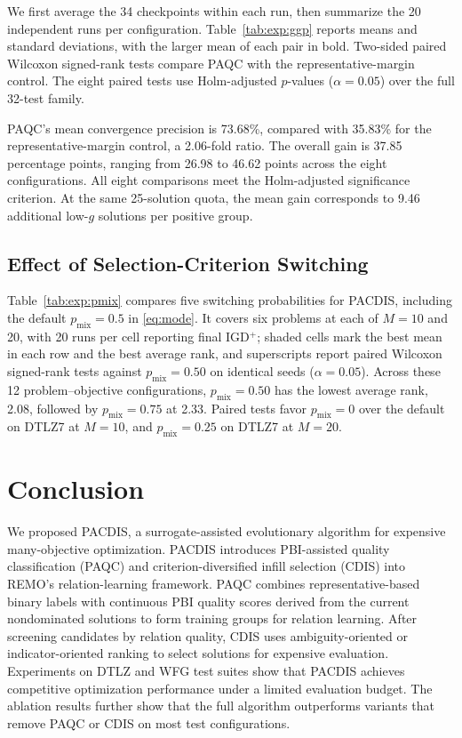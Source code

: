 \documentclass[final,5p,times,twocolumn]{elsarticle}
\begin{document}
We first average the 34 checkpoints within each run, then summarize the
20 independent runs per configuration. Table~\ref{tab:exp:ggp} reports
means and standard deviations, with the larger mean of each pair in bold. Two-sided paired Wilcoxon signed-rank tests
compare PAQC with the representative-margin control.
The eight paired tests use Holm-adjusted $p$-values ($\alpha=0.05$) over the
full 32-test family.

PAQC's mean convergence precision is 73.68\%, compared with 35.83\% for the
representative-margin control, a 2.06-fold ratio. The overall gain is 37.85
percentage points, ranging from 26.98 to 46.62 points across the eight
configurations. All eight comparisons meet the Holm-adjusted significance
criterion. At the same 25-solution quota, the mean gain corresponds to 9.46
additional low-$g$ solutions per positive group.

\subsection{Effect of Selection-Criterion Switching}
\label{sec:exp:pmix}

Table~\ref{tab:exp:pmix} compares five switching probabilities for PACDIS,
including the default $p_{\mathrm{mix}}=0.5$ in \eqref{eq:mode}.
It covers six problems at each of $M=10$ and 20, with 20 runs per cell
reporting final IGD$^+$; shaded cells mark the best mean in each row and the
best average rank, and superscripts report paired Wilcoxon signed-rank tests
against $p_{\mathrm{mix}}=0.50$ on identical seeds ($\alpha=0.05$). Across these 12 problem--objective configurations,
$p_{\mathrm{mix}}=0.50$ has the lowest average rank, 2.08, followed by
$p_{\mathrm{mix}}=0.75$ at 2.33. Paired tests favor
$p_{\mathrm{mix}}=0$ over the default on DTLZ7 at $M=10$, and
$p_{\mathrm{mix}}=0.25$ on DTLZ7 at $M=20$.

\section{Conclusion}\label{sec:conclusion}
We proposed PACDIS, a surrogate-assisted evolutionary algorithm for expensive
many-objective optimization. PACDIS introduces PBI-assisted quality classification
(PAQC) and criterion-diversified infill selection (CDIS) into REMO's relation-learning
framework. PAQC combines representative-based binary labels with continuous PBI
quality scores derived from the current nondominated solutions to form training
groups for relation learning. After screening candidates by relation quality,
CDIS uses ambiguity-oriented or indicator-oriented ranking to select solutions
for expensive evaluation. Experiments on DTLZ and WFG test suites show that
PACDIS achieves competitive optimization performance under a limited evaluation
budget. The ablation results further show that the full algorithm outperforms
variants that remove PAQC or CDIS on most test configurations.
\end{document}
